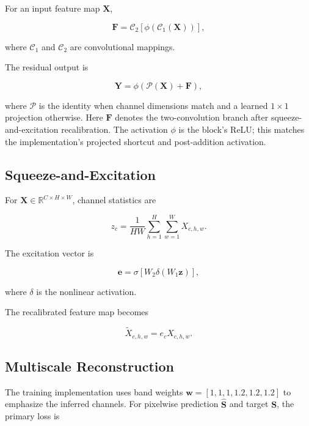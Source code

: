 \documentclass[11pt,a4paper]{article}
\newcommand{\R}{\mathbb{R}}
\newcommand{\vect}[1]{\bm{#1}}
\begin{document}
For an input feature map $\vect X$,

\begin{equation}
\vect F
=
\mathcal{C}_2
\left[
\phi
\left(
\mathcal{C}_1(\vect X)
\right)
\right],
\end{equation}

where $\mathcal C_1$ and $\mathcal C_2$ are convolutional mappings.

The residual output is

\begin{equation}
\vect Y
=
\phi\left(\mathcal P(\vect X)+\vect F\right),
\end{equation}

where $\mathcal P$ is the identity when channel dimensions match and a
learned $1\times1$ projection otherwise. Here $\vect F$ denotes the
two-convolution branch after squeeze-and-excitation recalibration.
The activation $\phi$ is the block's ReLU; this matches the
implementation's projected shortcut and post-addition activation.

\subsection{Squeeze-and-Excitation}

For $\vect X\in\R^{C\times H\times W}$, channel statistics are

\begin{equation}
z_c
=
\frac{1}{HW}
\sum_{h=1}^{H}
\sum_{w=1}^{W}
X_{c,h,w}.
\end{equation}

The excitation vector is

\begin{equation}
\vect e
=
\sigma
\left[
W_2
\delta
\left(
W_1\vect z
\right)
\right],
\end{equation}

where $\delta$ is the nonlinear activation.

The recalibrated feature map becomes

\begin{equation}
\tilde X_{c,h,w}
=
e_cX_{c,h,w}.
\end{equation}

\subsection{Multiscale Reconstruction}

The training implementation uses band weights
$\vect w=[1,1,1,1.2,1.2,1.2]$ to emphasize the inferred channels. For
pixelwise prediction $\hat{\vect S}$ and target $\vect S$, the primary
loss is
\end{document}
